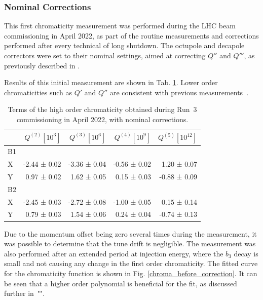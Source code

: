 \subsubsection{Nominal Corrections}

This first chromaticity measurement was performed during the LHC beam commissioning in April 2022,
as part of the routine measurements and corrections performed after every technical of long
shutdown.
The octupole and decapole correctors were set to their nominal settings, aimed at correcting $Q''$
and $Q'''$, as previously described in .

Results of this initial measurement are shown in Tab. \ref{chroma_fidel}. Lower order chromaticities such as
$Q'$ and $Q''$ are consistent with previous measurements~\cite{maclean_commissioning_2016}.

\begin{table}[tbh]
    \centering
    \small
    \setlength{\tabcolsep}{4.2pt}
    \begin{tabular}{|l||r|r|r|r|}
    \hline
                  & $Q^{(2)} [10^3]$ & $Q^{(3)} [10^6]$ & $Q^{(4)} [10^9]$ & $Q^{(5)} [10^{12}]$ \\ \hline\hline
        B1        &              &               &              & \\
        X         & -2.44 ± 0.02 & -3.36 ± 0.04 & -0.56 ± 0.02  &  1.20 ± 0.07 \\
        Y         &  0.97 ± 0.02 &  1.62 ± 0.05  &  0.15 ± 0.03 & -0.88 ± 0.09 \\ \hline
        B2        &              &               &              & \\
        X         & -2.45 ± 0.03 & -2.72 ± 0.08 & -1.00 ± 0.05  &  0.15 ± 0.14 \\
        Y         &  0.79 ± 0.03 & 1.54 ± 0.06  &  0.24 ± 0.04  & -0.74 ± 0.13 \\ \hline
    \end{tabular}
    \caption{Terms of the high order chromaticity obtained during Run~3 commissioning in April 2022, with nominal corrections.}
    \label{chroma_fidel}
\end{table}

Due to the momentum offset being zero several times during the measurement, it was possible to determine that
the tune drift is negligible. The measurement was also performed after an extended period at injection
energy, where the $b_3$ decay is small and not causing any change in the first order chromaticity.
The fitted curve for the chromaticity function is shown in Fig. \ref{chroma_before_correction}.
It can be seen that a higher order polynomial is beneficial for the fit, as discussed further in~"".


